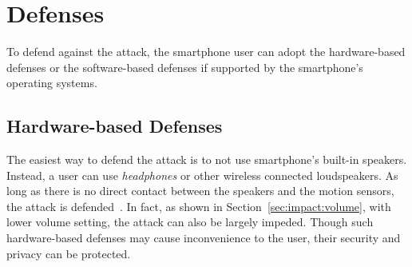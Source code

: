 

\section{Defenses}

To defend against the {\attackName} attack, the smartphone user can adopt the hardware-based defenses or the software-based defenses if supported by the smartphone's operating systems.
\subsection{Hardware-based Defenses}
The easiest way to defend the {\attackName} attack is to not use smartphone's built-in speakers. Instead, a user can use \textit{headphones} or other wireless connected loudspeakers. As long as there is no direct contact between the speakers and the motion sensors, the attack is defended~\cite{anand2018speechless}. In fact, as shown in Section~\ref{sec:impact:volume}, with lower volume setting, the {\attackName} attack can also be largely impeded. Though such hardware-based defenses may cause inconvenience to the user, their security and privacy can be protected.
